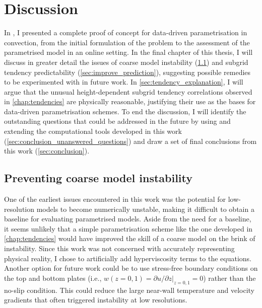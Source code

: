 \documentclass[../main.tex]{subfiles}
\begin{document}
\ifSubfilesClassLoaded{
    \frontmatter
    \tableofcontents
    \mainmatter
}{}

\chapter{Discussion} \label{chap:conclusion}
\setlength{\epigraphwidth}{.45\textwidth}

In , I presented a complete
proof of concept for data-driven parametrisation in \rb{} convection, from the
initial formulation of the problem to the assessment of the parametrised model
in an online setting. In the final chapter of this thesis, I will discuss in
greater detail the issues of coarse model instability (\cref{sec:instability})
and subgrid tendency predictability (\cref{sec:improve_prediction}), suggesting
possible remedies to be experimented with in future work. In
\cref{sec:tendency_explanation}, I will argue that the unusual height-dependent
subgrid tendency correlations observed in \cref{chap:tendencies} are physically
reasonable, justifying their use as the bases for data-driven parametrisation
schemes. To end the discussion, I will identify the outstanding questions that
could be addressed in the future by using and extending the computational tools
developed in this work (\cref{sec:conclusion_unanswered_questions}) and draw
a set of final conclusions from this work (\cref{sec:conclusion}).


\section{Preventing coarse model instability}
\label{sec:instability}
One of the earliest issues encountered in this work was the potential for
low-resolution models to become numerically unstable, making it difficult to
obtain a baseline for evaluating parametrised models. Aside from the need for
a baseline, it seems unlikely that a simple parametrisation scheme like the one
developed in \cref{chap:tendencies} would have improved the skill of a
coarse model on the brink of instability. Since this work was not concerned
with accurately representing physical reality, I chose to artificially add
hyperviscosity terms to the equations. Another option for future work could be
to use stress-free boundary conditions on the top and bottom plates (i.e.,
$w(z=0,1) = \partial u/\partial z|_{z=0,1} = 0$) rather than the no-slip
condition. This could reduce the large near-wall temperature and velocity
gradients that often triggered instability at low resolutions.
\end{document}
